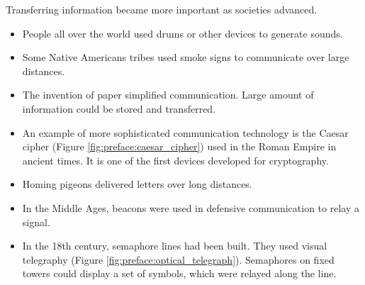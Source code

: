 \begin{refsection}
Transferring information became more important as societies advanced.
\begin{itemize}
	\item People all over the world used drums or other devices to generate sounds.
	\item Some Native Americans tribes used smoke signs to communicate over large distances.
	\item The invention of paper simplified communication. Large amount of information could be stored and transferred.
	\item An example of more sophisticated communication technology is the  Caesar cipher (Figure \ref{fig:preface:caesar_cipher}) used in the Roman Empire in ancient times. It is one of the first devices developed for cryptography.
	\item Homing pigeons delivered letters over long distances.
	\item In the Middle Ages, beacons were used in defensive communication to relay a signal.
	\item In the 18th century, semaphore lines had been built. They used visual telegraphy (Figure \ref{fig:preface:optical_telegraph}). Semaphores on fixed towers could display a set of symbols, which were relayed along the line.
\end{itemize}


\end{refsection}
